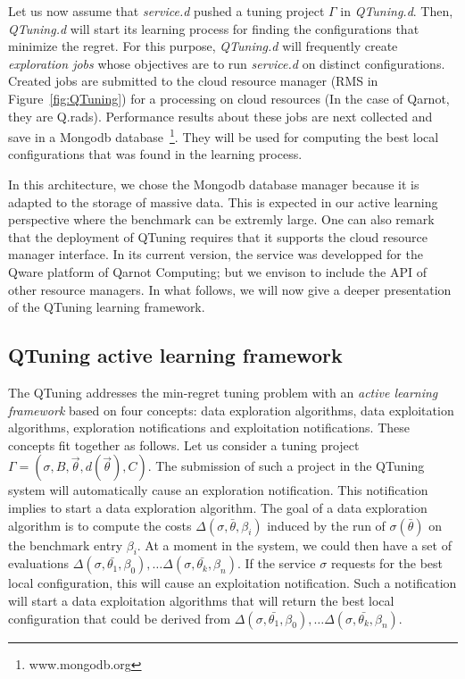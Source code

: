 \documentclass[10pt, conference, compsocconf]{IEEEtran}
\begin{document}
Let us now assume that {\it service.d} pushed a tuning project $\Gamma$ in  {\it QTuning.d}. Then, 
{\it QTuning.d} will start its  learning process for finding the configurations that minimize the regret. 
For this purpose, {\it QTuning.d} will frequently create {\it exploration jobs} whose objectives are to run 
 {\it service.d} on distinct configurations. Created jobs are submitted to the cloud resource manager (RMS in 
Figure~\ref{fig:QTuning}) for a processing on cloud resources (In the case of Qarnot, they are Q.rads). 
Performance results about these jobs are next collected and save in a Mongodb database~\footnote{www.mongodb.org}. 
They will be used for computing the best local configurations that was found in the learning process.

In this architecture, we chose the Mongodb database manager because it is adapted to the storage of massive data. 
This is expected in our active learning perspective where the benchmark can be extremly large.
One can also remark that the deployment of QTuning requires that it supports the cloud resource manager 
interface. In its current version, the service was developped for the Qware 
platform of Qarnot Computing; but we envison to include the API of other resource managers. 
In what follows, we will now give a deeper presentation of the QTuning learning framework.



\subsection{QTuning active learning framework} 

The QTuning addresses the min-regret tuning problem with an {\it active learning framework} 
based on four concepts: data exploration algorithms, data exploitation algorithms, 
exploration notifications and exploitation notifications. These concepts fit together as follows. Let us consider 
a tuning project  $\Gamma = (\sigma, B, \vec{\theta}, d(\vec{\theta}), C)$. The submission of such a project 
in the QTuning system will automatically cause an exploration notification. This notification implies 
to start a data exploration algorithm. The goal of a data exploration algorithm is to  
compute the costs $\Delta(\sigma, \bar{\theta}, \beta_i)$  induced by the run of  $\sigma(\bar{\theta})$ on the benchmark 
entry $\beta_i$.  At a moment in the system, we could then have a set of evaluations 
$\Delta(\sigma, \bar{\theta_1}, \beta_0), \dots \Delta(\sigma, \bar{\theta_k}, \beta_n)$. If the service $\sigma$ 
 requests for the best local configuration, this will cause an exploitation notification. Such a notification will 
start a data exploitation algorithms that will return the best local configuration that could be derived from 
$\Delta(\sigma, \bar{\theta_1}, \beta_0), \dots \Delta(\sigma, \bar{\theta_k}, \beta_n)$.
\end{document}
